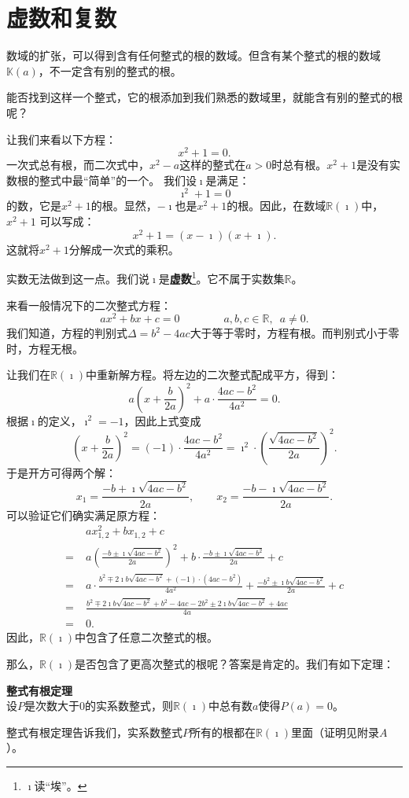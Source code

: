 \documentclass[12pt,UTF8]{ctexbook}
\begin{document}
\section{虚数和复数}

数域的扩张，可以得到含有任何整式的根的数域。但含有某个整式的根的数域$\mathbb{K}(a)$，不一定含有别的整式的根。

能否找到这样一个整式，它的根添加到我们熟悉的数域里，就能含有别的整式的根呢？

让我们来看以下方程：
$$ x^2 + 1 = 0.$$
一次式总有根，而二次式中，$x^2 - a$这样的整式在$a>0$时总有根。$x^2 + 1$是没有实数根的整式中最“简单”的一个。
我们设$\imath$是满足：
$$ \imath^2 + 1 = 0$$
的数，它是$x^2 + 1$的根。显然，$-\imath$也是$x^2 + 1$的根。因此，在数域$\mathbb{R}(\imath)$中，$x^2 + 1$
可以写成：
$$ x^2 + 1 = (x - \imath)(x + \imath).$$
这就将$x^2 + 1$分解成一次式的乘积。

实数无法做到这一点。我们说$\imath$是\textbf{虚数}\footnote{$\imath$读“埃”。}。它不属于实数集$\mathbb{R}$。

来看一般情况下的二次整式方程：
$$ ax^2 + bx + c = 0  \qquad \qquad a,b,c \in \mathbb{R}, \,\,\, a \neq 0. $$
我们知道，方程的判别式$\Delta = b^2 - 4ac$大于等于零时，方程有根。而判别式小于零时，方程无根。

让我们在$\mathbb{R}(\imath)$中重新解方程。将左边的二次整式配成平方，得到：
$$ a(x + \frac{b}{2a})^2 + a\cdot \frac{4ac - b^2}{4a^2} = 0. $$
根据$\imath$的定义，$\imath^2 = -1$，因此上式变成
$$ \left(x + \frac{b}{2a}\right)^2 = (-1) \cdot \frac{4ac - b^2}{4a^2} = \imath^2 \cdot \left(\frac{\sqrt{4ac - b^2}}{2a}\right)^2. $$
于是开方可得两个解：
$$ x_1 = \frac{-b + \imath \sqrt{4ac - b^2} }{2a}, \qquad x_2 = \frac{-b - \imath \sqrt{4ac - b^2} }{2a}. $$
可以验证它们确实满足原方程：
\begin{align*}
     &\; ax_{1,2}^2 + b x_{1,2} + c  \\
    =&\; a\left(\frac{-b \pm \imath \sqrt{4ac - b^2} }{2a}\right)^2 + b\cdot \frac{-b \pm \imath \sqrt{4ac - b^2} }{2a} + c \\
    =&\; a \cdot \frac{b^2 \mp 2\imath b \sqrt{4ac - b^2} + (-1)\cdot (4ac - b^2) }{4a^2} + \frac{-b^2 \pm \imath b \sqrt{4ac - b^2} }{2a} + c \\
    =&\; \frac{b^2 \mp 2\imath b \sqrt{4ac - b^2} + b^2 - 4ac -2b^2 \pm 2 \imath b \sqrt{4ac - b^2} + 4ac }{4a} \\
    =&\; 0.
\end{align*}
因此，$\mathbb{R}(\imath)$中包含了任意二次整式的根。

那么，$\mathbb{R}(\imath)$是否包含了更高次整式的根呢？答案是肯定的。我们有如下定理：
\begin{tm}{\textbf{整式有根定理}}
    \mbox{} \\
    \indent 设$P$是次数大于$0$的实系数整式，则$\mathbb{R}(\imath)$中总有数$a$使得$P(a) = 0$。
\end{tm}
整式有根定理告诉我们，实系数整式$P$所有的根都在$\mathbb{R}(\imath)$里面（证明见附录$A$）。
\end{document}
